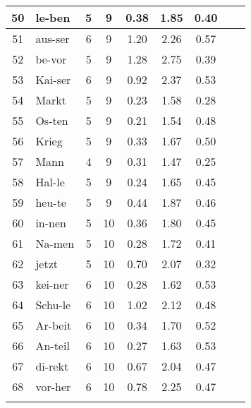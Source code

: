 {\begin{longtable}{clccccccc}
50 & le-ben & 5 & 9 & 0.38 & 1.85 & 0.40 \\ \hline
51 & aus-ser & 6 & 9 & 1.20 & 2.26 & 0.57 \\ \hline
52 & be-vor & 5 & 9 & 1.28 & 2.75 & 0.39 \\ \hline
53 & Kai-ser & 6 & 9 & 0.92 & 2.37 & 0.53 \\ \hline
54 & Markt & 5 & 9 & 0.23 & 1.58 & 0.28 \\ \hline
55 & Os-ten & 5 & 9 & 0.21 & 1.54 & 0.48 \\ \hline
56 & Krieg & 5 & 9 & 0.33 & 1.67 & 0.50 \\ \hline
57 & Mann & 4 & 9 & 0.31 & 1.47 & 0.25 \\ \hline
58 & Hal-le & 5 & 9 & 0.24 & 1.65 & 0.45 \\ \hline
59 & heu-te & 5 & 9 & 0.44 & 1.87 & 0.46 \\ \hline
60 & in-nen & 5 & 10 & 0.36 & 1.80 & 0.45 \\ \hline
61 & Na-men & 5 & 10 & 0.28 & 1.72 & 0.41 \\ \hline
62 & jetzt & 5 & 10 & 0.70 & 2.07 & 0.32 \\ \hline
63 & kei-ner & 6 & 10 & 0.28 & 1.62 & 0.53 \\ \hline
64 & Schu-le & 6 & 10 & 1.02 & 2.12 & 0.48 \\ \hline
65 & Ar-beit & 6 & 10 & 0.34 & 1.70 & 0.52 \\ \hline
66 & An-teil & 6 & 10 & 0.27 & 1.63 & 0.53 \\ \hline
67 & di-rekt & 6 & 10 & 0.67 & 2.04 & 0.47 \\ \hline
68 & vor-her & 6 & 10 & 0.78 & 2.25 & 0.47 \\ \hline
\bottomrule
\label{tab:longlist}
\end{longtable}
}
